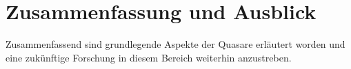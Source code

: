 
\chapter{Zusammenfassung und Ausblick}
\label{chapter-fazit}

Zusammenfassend sind grundlegende Aspekte der Quasare erläutert worden und eine zukünftige Forschung in diesem Bereich weiterhin anzustreben.